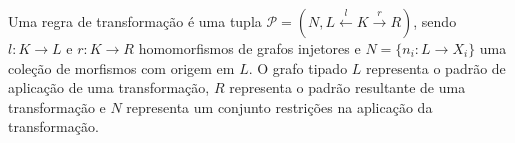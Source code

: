 \documentclass[25pt, a0paper]{tikzposter}
\begin{document}
\begin{columns}
{            Uma regra de transformação\cite{ehrig2006} é uma tupla $\mathcal P = (N,L\xleftarrow{l} K \xrightarrow{r} R)$, sendo $l : K \to L$ e $r: K \to R$ homomorfismos de grafos injetores e $N = \{ n_i : L \to X_i \}$ uma coleção de morfismos com origem em $L$. O grafo tipado $L$ representa o padrão de aplicação de uma transformação, $R$ representa o padrão resultante de uma transformação e $N$ representa um conjunto restrições na aplicação da transformação.

        }


\end{columns}
\end{document}
